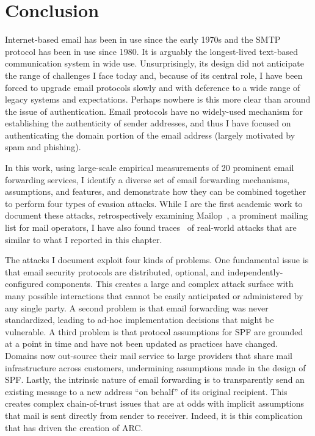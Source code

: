 \section{Conclusion}
\label{sec:discussion}
Internet-based email has been in use since the early 1970s
and the SMTP protocol has been in use since 1980.  It is arguably the
longest-lived text-based communication system in wide use.
Unsurprisingly, its design did not anticipate the range of challenges
I face today and, because of its central role, I have been forced
to upgrade email protocols slowly and with deference to a wide range
of legacy systems and expectations. Perhaps nowhere is this more clear
than around the issue of authentication.  Email protocols have no
widely-used mechanism for establishing the authenticity of sender
addresses, and thus I have focused on authenticating the domain
portion of the email address (largely motivated by spam and phishing).

In this work, using large-scale empirical measurements of 20 prominent email forwarding services, I identify a diverse set of email forwarding mechanisms, assumptions, and features, and demonstrate how they can be combined together to perform four types of evasion attacks. While I are the first academic work to document these attacks, retrospectively examining Mailop~\cite{Mailop96:online}, a prominent mailing list for mail operators, I have also found traces~\cite{RealTraces} of real-world attacks that are similar to what I reported in this chapter. 

The attacks I document exploit four kinds of problems. One fundamental issue is that email security protocols are
distributed, optional, and independently-configured components. This creates a large and complex attack surface with many
possible interactions that cannot be easily anticipated or
administered by any single party. A second problem is that email forwarding was never standardized, leading to ad-hoc implementation decisions that might be vulnerable. A third problem is that protocol assumptions for SPF are grounded at a
point in time and have not been updated as practices have changed. Domains now out-source their mail service to large providers that share mail infrastructure across customers, undermining assumptions made in the design of SPF. Lastly, the intrinsic nature of email forwarding is to transparently send an existing message to a new address ``on behalf'' of its original recipient. 
This creates complex chain-of-trust issues that are at odds with implicit assumptions that mail is sent directly from sender to receiver. Indeed, it is this complication that has driven the creation of ARC.


